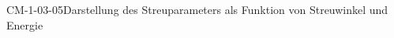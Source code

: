 
\begin{PROP}{CM-1-03-05}{Darstellung des Streuparameters als Funktion von Streuwinkel und Energie}
\end{PROP}
